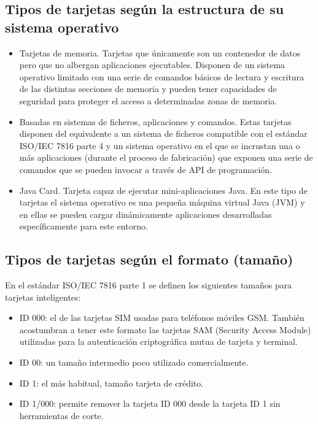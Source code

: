 \subsection{Tipos de tarjetas según la estructura de su sistema operativo}

\begin{itemize}
\item Tarjetas de memoria. Tarjetas que únicamente son un contenedor de datos pero que no albergan aplicaciones ejecutables. Disponen de un sistema operativo limitado con una serie de comandos básicos de lectura y escritura de las distintas secciones de memoria y pueden tener capacidades de seguridad para proteger el acceso a determinadas zonas de memoria. 
\item Basadas en sistemas de ficheros, aplicaciones y comandos. Estas tarjetas disponen del equivalente a un sistema de ficheros compatible con el estándar ISO/IEC 7816 parte 4 y un sistema operativo en el que se incrustan una o más aplicaciones (durante el proceso de fabricación) que exponen una serie de comandos que se pueden invocar a través de API de programación. 
\item Java Card. Tarjeta capaz de ejecutar mini-aplicaciones Java. En este tipo de tarjetas el sistema operativo es una pequeña máquina virtual Java (JVM) y en ellas se pueden cargar dinámicamente aplicaciones desarrolladas específicamente para este entorno. 
\end{itemize}


\subsection{Tipos de tarjetas según el formato (tamaño)}

En el estándar ISO/IEC 7816 parte 1 se definen los siguientes tamaños para tarjetas inteligentes:

\begin{itemize}
\item ID 000: el de las tarjetas SIM usadas para teléfonos móviles GSM. También acostumbran a tener este formato las tarjetas SAM (Security Access Module) utilizadas para la autenticación criptográfica mutua de tarjeta y terminal. 
\item ID 00: un tamaño intermedio poco utilizado comercialmente. 
\item ID 1: el más habitual, tamaño tarjeta de crédito. 
\item ID 1/000: permite remover la tarjeta ID 000 desde la tarjeta ID 1 sin herramientas de corte.
\end{itemize}


